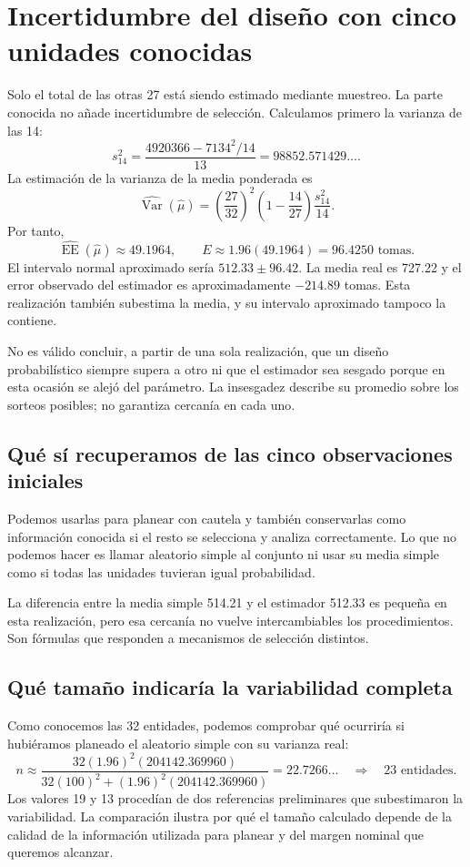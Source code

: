 \documentclass[11pt,letterpaper]{article}
\begin{document}
\section{Incertidumbre del diseño con cinco unidades conocidas}
Solo el total de las otras 27 está siendo estimado mediante muestreo. La parte conocida no añade incertidumbre de selección. Calculamos primero la varianza de las 14:
\[
s_{14}^2=\frac{4920366-7134^2/14}{13}=98852.571429\ldots.
\]
La estimación de la varianza de la media ponderada es
\[
\widehat{\operatorname{Var}}(\widehat\mu)
=\left(\frac{27}{32}\right)^2\left(1-\frac{14}{27}\right)\frac{s_{14}^2}{14}.
\]
Por tanto,
\[
\widehat{\operatorname{EE}}(\widehat\mu)\approx49.1964,
\qquad E\approx1.96(49.1964)=96.4250\text{ tomas}.
\]
El intervalo normal aproximado sería $512.33\pm96.42$. La media real es 727.22 y el error observado del estimador es aproximadamente $-214.89$ tomas. Esta realización también subestima la media, y su intervalo aproximado tampoco la contiene.

No es válido concluir, a partir de una sola realización, que un diseño probabilístico siempre supera a otro ni que el estimador sea sesgado porque en esta ocasión se alejó del parámetro. La insesgadez describe su promedio sobre los sorteos posibles; no garantiza cercanía en cada uno.
\subsection{Qué sí recuperamos de las cinco observaciones iniciales}
Podemos usarlas para planear con cautela y también conservarlas como información conocida si el resto se selecciona y analiza correctamente. Lo que no podemos hacer es llamar aleatorio simple al conjunto ni usar su media simple como si todas las unidades tuvieran igual probabilidad.

La diferencia entre la media simple 514.21 y el estimador 512.33 es pequeña en esta realización, pero esa cercanía no vuelve intercambiables los procedimientos. Son fórmulas que responden a mecanismos de selección distintos.
\subsection{Qué tamaño indicaría la variabilidad completa}
Como conocemos las 32 entidades, podemos comprobar qué ocurriría si hubiéramos planeado el aleatorio simple con su varianza real:
\[
n\approx\frac{32(1.96)^2(204142.369960)}{32(100)^2+(1.96)^2(204142.369960)}
=22.7266\ldots\quad\Rightarrow\quad23\text{ entidades}.
\]
Los valores 19 y 13 procedían de dos referencias preliminares que subestimaron la variabilidad. La comparación ilustra por qué el tamaño calculado depende de la calidad de la información utilizada para planear y del margen nominal que queremos alcanzar.
\end{document}
